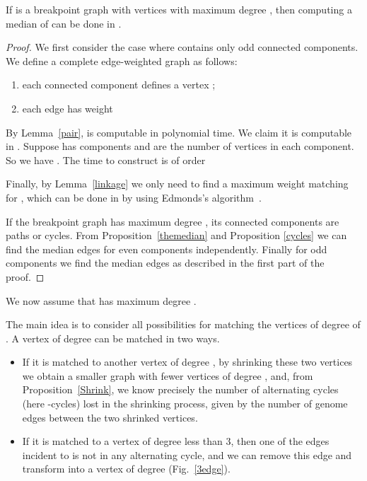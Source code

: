 \documentclass[10pt]{llncs}
\begin{document}
\begin{proposition}\label{odds}
  If  is a breakpoint graph with  vertices with maximum degree
  , then computing a median of  can be done in .
\end{proposition}

\begin{proof}
    We first consider the case where  contains only odd connected
    components. We define a complete edge-weighted graph  as
    follows:
   \begin{enumerate}
    \item each connected component  defines a vertex ;
    \item each edge  has weight  
    \end{enumerate}
    By Lemma~\ref{pair},  is computable in polynomial time. We
    claim it is computable in .  Suppose  has 
    components and  are the number of vertices in
    each component. So we have . The time to
    construct  is of order
    
    
    
    Finally, by Lemma~\ref{linkage} we only need to find a maximum
    weight matching for , which can be done in  by
    using Edmonds's algorithm~\cite{Edmonds}.  

    If the breakpoint graph  has maximum degree , its connected
    components are paths or cycles. From Proposition~\ref{themedian}
    and Proposition \ref{cycles} we can find the median edges for even
    components independently. Finally for odd components we find the
    median edges as described in the first part of the proof. \end{proof}
    



  We now assume that
 has maximum degree .  

The main idea is to consider all possibilities for matching the
vertices of degree  of . A vertex  of degree  can be matched
in two ways.
\begin{itemize}
\item If it is matched to another vertex of degree , by shrinking
  these two vertices we obtain a smaller graph with fewer vertices of
  degree , and, from Proposition~\ref{Shrink}, we know precisely
  the number of alternating cycles (here -cycles) lost in the
  shrinking process, given by the number of genome edges between the
  two shrinked vertices.
\item If it is matched to a vertex of degree less than 3, then one of
  the edges incident to  is not in any alternating cycle, and we
  can remove this edge and transform  into a vertex of degree 
  (Fig.~\ref{3edge}).
\end{itemize}
\end{document}
